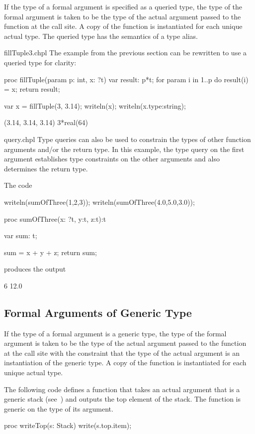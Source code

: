 If the type of a formal argument is specified as a queried type, the
type of the formal argument is taken to be the type of the actual
argument passed to the function at the call site.  A copy of the
function is instantiated for each unique actual type.  The queried
type has the semantics of a type alias.
\begin{chapelexample}{fillTuple3.chpl}
The example from the previous section can be rewritten to use a
queried type for clarity:
\begin{chapel}
proc fillTuple(param p: int, x: ?t) {
  var result: p*t;
  for param i in 1..p do
    result(i) = x;
  return result;
}
\end{chapel}
\begin{chapelpost}
var x = fillTuple(3, 3.14);
writeln(x);
writeln(x.type:string);
\end{chapelpost}
\begin{chapeloutput}
(3.14, 3.14, 3.14)
3*real(64)
\end{chapeloutput}
\end{chapelexample}

\begin{chapelexample}{query.chpl}
Type queries can also be used to constrain the types of other function arguments
and/or the return type.  In this example, the type query on the first argument
establishes type constraints on the other arguments and also determines the
return type.

The code
\begin{chapel}
writeln(sumOfThree(1,2,3));
writeln(sumOfThree(4.0,5.0,3.0));

proc sumOfThree(x: ?t, y:t, z:t):t {
   var sum: t;

   sum = x + y + z;
   return sum;
}
\end{chapel}
produces the output
\begin{chapelprintoutput}{}
6
12.0
\end{chapelprintoutput}
\end{chapelexample}

\subsection{Formal Arguments of Generic Type}
\label{Formal_Arguments_of_Generic_Type}

If the type of a formal argument is a generic type, the type of the
formal argument is taken to be the type of the actual argument passed
to the function at the call site with the constraint that the type of
the actual argument is an instantiation of the generic type. A copy
of the function is instantiated for each unique actual type.
\begin{example}
The following code defines a function  that takes an
actual argument that is a generic stack
(see~) and outputs the top element of the
stack.  The function is generic on the type of its argument.
\begin{chapel}
proc writeTop(s: Stack) {
  write(s.top.item);
}
\end{chapel}
\end{example}

